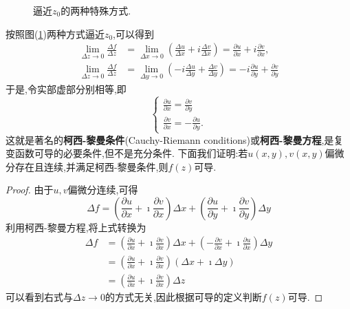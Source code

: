 \begin{figure}
    \centering
    
    \caption{逼近$z_0$的两种特殊方式.}
    \label{fig:limits}
\end{figure}
按照图(\ref{fig:limits})两种方式逼近$z_0$,可以得到
\begin{align}
    \lim _{\Delta z \rightarrow 0} \frac{\Delta f}{\Delta z} &=\lim _{\Delta x \rightarrow 0}\left(\frac{\Delta u}{\Delta x}+i \frac{\Delta v}{\Delta x}\right)=\frac{\partial u}{\partial x}+i \frac{\partial v}{\partial x},
\\
    \lim _{\Delta z \rightarrow 0} \frac{\Delta f}{\Delta z} &=\lim _{\Delta y \rightarrow 0}\left(-i \frac{\Delta u}{\Delta y}+\frac{\Delta v}{\Delta y}\right)=-i \frac{\partial u}{\partial y}+\frac{\partial v}{\partial y}
\end{align}
于是,令实部虚部分别相等,即
\begin{equation}
    \begin{cases}
        \frac{\partial u}{\partial x}=\frac{\partial v}{\partial y} \\
        \frac{\partial v}{\partial x}=-\frac{\partial u}{\partial y} .
    \end{cases}
\end{equation}
这就是著名的{\bf 柯西-黎曼条件}(Cauchy-Riemann conditions)或{\bf 柯西-黎曼方程},是复变函数可导的必要条件,但不是充分条件.
下面我们证明:若$u(x,y), v(x,y)$偏微分存在且连续,并满足柯西-黎曼条件,则$f(z)$可导.
\begin{proof}
    由于$u,v$偏微分连续,可得
    \begin{equation*}
        \Delta f=\left(\frac{\partial u}{\partial x}+\imath \frac{\partial v}{\partial x}\right) \Delta x+\left(\frac{\partial u}{\partial y}+ \imath \frac{\partial v}{\partial y}\right) \Delta y
    \end{equation*}
    利用柯西-黎曼方程,将上式转换为
    \begin{equation*}
        \begin{aligned}
        \Delta f & =\left(\frac{\partial u}{\partial x}+ \imath \frac{\partial v}{\partial x}\right) \Delta x+\left(-\frac{\partial v}{\partial x}+ \imath\frac{\partial u}{\partial x}\right) \Delta y \\
        & =\left(\frac{\partial u}{\partial x}+ \imath \frac{\partial v}{\partial x}\right)(\Delta x+ \imath \Delta y) 
        \\
        & = \left(\frac{\partial u}{\partial x}+ \imath \frac{\partial v}{\partial x}\right) \Delta z
        \end{aligned}
    \end{equation*}
可以看到右式与$\Delta z\to 0$的方式无关,因此根据可导的定义判断$f(z)$可导.
\end{proof}
